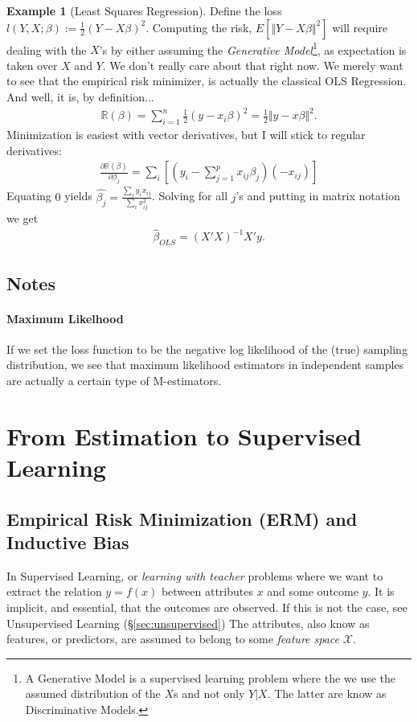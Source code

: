 \documentclass[12pt,a4paper]{article}
\theoremstyle{plain}
\theoremstyle{definition}
\newtheorem{example}{Example}
\newcommand{\expect}[1]{E\left[ #1 \right]}
\newcommand{\norm}[1]{\Vert #1 \Vert}
\newcommand{\loss}{l}
\newcommand{\riskn}{\mathbb{R}}
\newcommand{\deriv}[2]{\frac{\partial #1}{\partial #2}}
\newcommand{\hyp}{f}
\newcommand{\featureS}{\mathcal{X}}
\begin{document}
\begin{example}[Least Squares Regression]
\label{eg:OLS}
Define the loss $\loss(Y,X;\beta):=\frac{1}{2}(Y-X\beta)^2$.
Computing the risk, $\expect{\norm{Y-X\beta}^2}$ will require dealing with the $X$'s by either assuming the \emph{Generative Model}\footnote{A Generative Model is a supervised learning problem where the we use the assumed distribution of the $X$s and not only $Y|X$. The latter are know as Discriminative Models.}, as expectation is taken over $X$ and $Y$. 
We don't really care about that right now. 
We merely want to see that the empirical risk minimizer, is actually the classical OLS Regression. And well, it is, by definition...
\begin{align*}
	\riskn(\beta)=\sum_{i=1}^n 	\frac{1}{2}(y-x_i\beta)^2 = \frac{1}{2}\norm{y-x\beta}^2.
\end{align*}
Minimization is easiest with vector derivatives, but I will stick to regular derivatives:
\begin{align*}
	\deriv{\riskn(\beta)}{{\beta_j}} = \sum_i \left[ (y_i-\sum_{j=1}^p x_{ij}\beta_j)(-x_{ij}) \right]
\end{align*}
Equating $0$ yields $\hat{\beta_j}=\frac{\sum_i y_i x_{ij}}{\sum_i x_{ij}^2}$.
Solving for all $j$'s and putting in matrix notation we get
\begin{align}
	\hat{\beta}_{OLS}=(X'X)^{-1} X'y.
\end{align}


\end{example}


\subsection{Notes}
\paragraph{Maximum Likelhood} 
If we set the loss function to be the negative log likelihood of the (true) sampling distribution, we see that maximum likelihood estimators in independent samples are actually a certain type of M-estimators.


\section{From Estimation to Supervised Learning}
\label{sec:learning}

\subsection{Empirical Risk Minimization (ERM) and Inductive Bias}
In Supervised Learning, or \emph{learning with teacher} problems where we want to extract the relation $y=\hyp(x)$ between attributes $x$ and some outcome $y$.
It is implicit, and essential, that the outcomes are observed. If this is not the case, see Unsupervised Learning (\S\ref{sec:unsupervised})
The attributes, also know as features, or predictors, are assumed to belong to some \emph{feature space} $\featureS$. 
\end{document}
